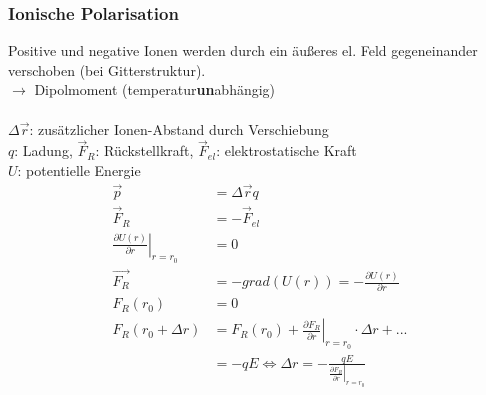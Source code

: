 \documentclass[a4paper,twocolumn,10pt]{article}
\begin{document}
\subsubsection{Ionische Polarisation}
Positive und negative Ionen werden durch ein äußeres el. Feld gegeneinander verschoben (bei Gitterstruktur).\\
$\rightarrow$ Dipolmoment (temperatur\textbf{un}abhängig)\\\\
$\Delta \overrightarrow{r}$: zusätzlicher Ionen-Abstand durch Verschiebung\\
$q$: Ladung, $\overrightarrow{F}_R$: Rückstellkraft, $\overrightarrow{F}_{el}$: elektrostatische Kraft\\
$U$: potentielle Energie
\begin{equation*}
\begin{split}
\overrightarrow{p}&=\Delta\overrightarrow{r}q\\
\overrightarrow{F}_R&=-\overrightarrow{F}_{el}\\
\left.\frac{\partial U(r)}{\partial r}\right|_{r=r_0}&=0\\
\overrightarrow{F_R}&=-grad(U(r))=-\frac{\partial U(r)}{\partial r}\\
F_R(r_0)&=0\\
F_R(r_0+\Delta r)&=F_R(r_0)+\left.\frac{\partial F_R}{\partial r}\right|_{r=r_0}\cdot\Delta r+...\\
&=-qE\Leftrightarrow \Delta r=-\frac{qE}{\left.\frac{\partial F_R}{\partial r}\right|_{r=r_0}}
\end{split}
\end{equation*}
\end{document}
